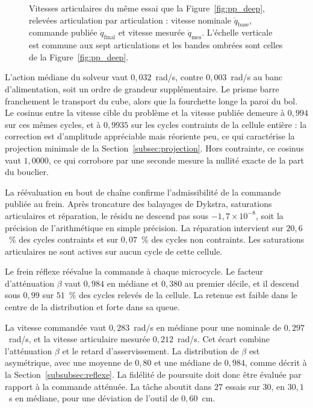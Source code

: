 \begin{figure}[!htbp]
    \centering
    
    \caption[Profils de vitesses articulaires (saisie et dépôt)]{Vitesses articulaires du même essai que la Figure~\ref{fig:pp_deep}, relevées articulation par articulation : vitesse nominale $\dot{q}_{\mathrm{base}}$, commande publiée $\dot{q}_{\mathrm{final}}$ et vitesse mesurée $\dot{q}_{\mathrm{mes}}$. L'échelle verticale est commune aux sept articulations et les bandes ombrées sont celles de la Figure~\ref{fig:pp_deep}.}\label{fig:pp_vel_joints}
\end{figure}

L'action médiane du solveur vaut $0{,}032$~rad/s, contre $0{,}003$~rad/s au banc d'alimentation, soit un ordre de grandeur supplémentaire. Le prisme barre franchement le transport du cube, alors que la fourchette longe la paroi du bol. Le cosinus entre la vitesse cible du problème et la vitesse publiée demeure à $0{,}994$ sur ces mêmes cycles, et à $0{,}9935$ sur les cycles contraints de la cellule entière : la correction est d'amplitude appréciable mais réoriente peu, ce qui caractérise la projection minimale de la Section~\ref{subsec:projection}. Hors contrainte, ce cosinus vaut $1{,}0000$, ce qui corrobore par une seconde mesure la nullité exacte de la part du bouclier.

La réévaluation en bout de chaîne confirme l'admissibilité de la commande publiée au frein. Après troncature des balayages de Dykstra, saturations articulaires et réparation, le résidu ne descend pas sous $-1{,}7\times10^{-8}$, soit la précision de l'arithmétique en simple précision. La réparation intervient sur $20{,}6$~\% des cycles contraints et sur $0{,}07$~\% des cycles non contraints. Les saturations articulaires ne sont actives sur aucun cycle de cette cellule.

Le frein réflexe réévalue la commande à chaque microcycle. Le facteur d'atténuation $\beta$ vaut $0{,}984$ en médiane et $0{,}380$ au premier décile, et il descend sous $0{,}99$ sur $51$~\% des cycles relevés de la cellule. La retenue est faible dans le centre de la distribution et forte dans sa queue.

La vitesse commandée vaut $0{,}283$~rad/s en médiane pour une nominale de $0{,}297$~rad/s, et la vitesse articulaire mesurée $0{,}212$~rad/s. Cet écart combine l'atténuation $\beta$ et le retard d'asservissement. La distribution de $\beta$ est asymétrique, avec une moyenne de $0{,}80$ et une médiane de $0{,}984$, comme décrit à la Section~\ref{subsubsec:reflexe}. La fidélité de poursuite doit donc être évaluée par rapport à la commande atténuée. La tâche aboutit dans $27$ essais sur $30$, en $30{,}1$~s en médiane, pour une déviation de l'outil de $0{,}60$~cm.

